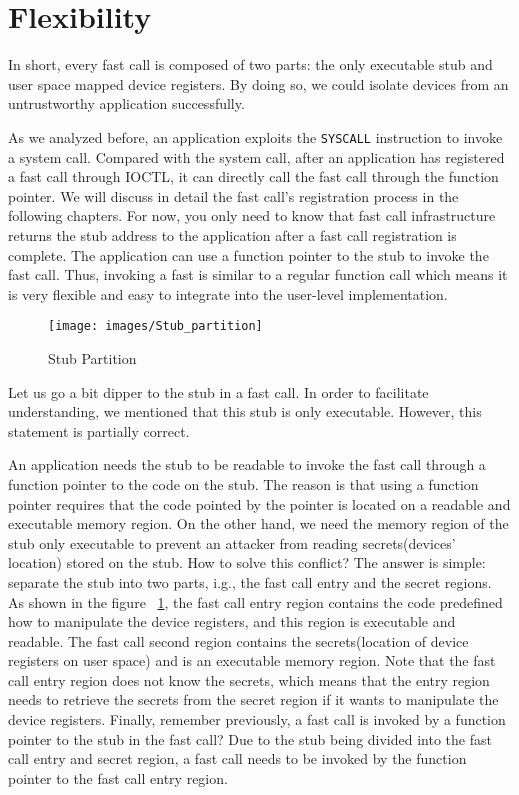 \section{Flexibility}
In short, every fast call is composed of two parts: the only 
executable stub and user space mapped device registers. 
By doing so, we could isolate devices from an untrustworthy 
application successfully. 

As we analyzed before, an application exploits the 
\verb|SYSCALL| instruction to invoke a system call. 
Compared with the system call, after an application has 
registered a fast call through IOCTL, it can directly call 
the fast call through the function pointer. We will discuss 
in detail the fast call's registration process in the following 
chapters. For now, you only need to know that fast call infrastructure 
returns the stub address to the application after a fast 
call registration is complete.  The application can use a 
function pointer to the stub to invoke the fast call. Thus, 
invoking a fast is similar to a regular function call which 
means it is very flexible and easy to integrate into the 
user-level implementation.

\begin{figure}[tbp]
  \centering
  \texttt{[image: images/Stub\_partition]}
  \caption[Short description]{Stub Partition}
  \label{fig:Stub_partition}
\end{figure}

Let us go a bit dipper to the stub in a fast call. 
In order to facilitate understanding, we mentioned that this 
stub is only executable. However, this statement is partially correct. 

An application needs the stub to be readable to invoke 
the fast call through a function pointer to the code on 
the stub. The reason is that using a function pointer requires 
that the code pointed by the pointer is located on a readable 
and executable memory region. On the other hand, we need the 
memory region of the stub only executable to prevent an attacker 
from reading secrets(devices' location) stored on the stub. 
How to solve this conflict? The answer is simple: separate the 
stub into two parts, i.g., the fast call entry and the secret regions. 
As shown in the figure  ~\ref{fig:Stub_partition}, the fast 
call entry region contains the code predefined how to manipulate 
the device registers, and this region is executable and readable. 
The fast call second region contains the secrets(location of device 
registers on user space) and is an executable memory region. 
Note that the fast call entry region does not know the secrets, 
which means that the entry region needs to retrieve the secrets 
from the secret region if it wants to manipulate the device registers.
Finally, remember previously, a fast call is invoked by a function 
pointer to the stub in the fast call?  Due to the stub being divided 
into the fast call entry and secret region, a fast call needs to be 
invoked by the function pointer to the fast call entry region.
